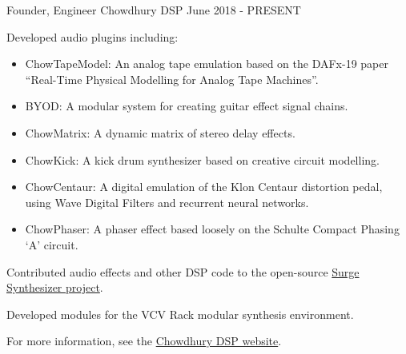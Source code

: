 

\begin{cventries}

  \cventry
    {Founder, Engineer} %
    {Chowdhury DSP} %
    {} %
    {June 2018 - PRESENT} %
    {
      \begin{cvitems} %
        \item {Developed audio plugins including:}
        \begin{itemize}
            \item {ChowTapeModel: An analog tape emulation based on the DAFx-19 paper ``Real-Time Physical Modelling for Analog Tape Machines''.}
            \item {BYOD: A modular system for creating guitar effect signal chains.}
            \item {ChowMatrix: A dynamic matrix of stereo delay effects.}
            \item {ChowKick: A kick drum synthesizer based on creative circuit modelling.}
            \item {ChowCentaur: A digital emulation of the Klon Centaur distortion pedal, using Wave Digital Filters and recurrent neural networks.}
            \item {ChowPhaser: A phaser effect based loosely on the Schulte Compact Phasing `A' circuit.}
        \end{itemize}
        \item {Contributed audio effects and other DSP code to the open-source \href{https://surge-synthesizer.github.io}{Surge Synthesizer project}.}
        \item {Developed modules for the VCV Rack modular synthesis environment.}
        \item {For more information, see the \href{https://chowdsp.com}{Chowdhury DSP website}.}
      \end{cvitems}
    }


\end{cventries}
